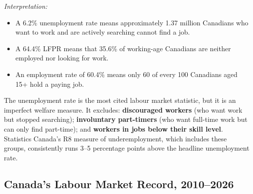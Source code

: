 \noindent\textit{Interpretation:}
\begin{itemize}
  \item A 6.2\% unemployment rate means approximately 1.37 million
        Canadians who want to work and are actively searching cannot
        find a job.
  \item A 64.4\% LFPR means that 35.6\% of working-age Canadians are
        neither employed nor looking for work.
  \item An employment rate of 60.4\% means only 60 of every 100 Canadians
        aged 15+ hold a paying job.
\end{itemize}

\begin{keytakeaway}
The unemployment rate is the most cited labour market statistic, but it
is an imperfect welfare measure. It excludes: \textbf{discouraged workers}
(who want work but stopped searching); \textbf{involuntary part-timers}
(who want full-time work but can only find part-time); and \textbf{workers
in jobs below their skill level}. Statistics Canada's R8 measure of
underemployment, which includes these groups, consistently runs 3--5
percentage points above the headline unemployment rate.
\end{keytakeaway}

\subsection{Canada's Labour Market Record, 2010--2026}

